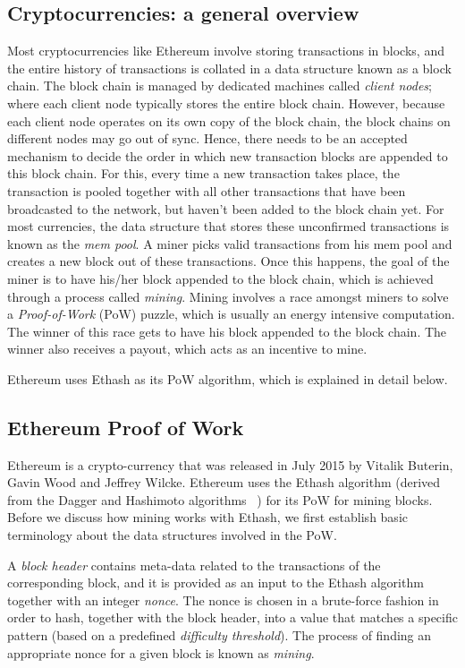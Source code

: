 \documentclass[runningheads]{llncs}
\begin{document}
\subsection{Cryptocurrencies: a general overview}
Most cryptocurrencies like Ethereum involve storing transactions in blocks, and the entire history of transactions is collated in a data structure known as a block chain. The block chain is managed by dedicated machines called \emph{client nodes}; where each client node typically stores the entire block chain. However, because each client node operates on its own copy of the block chain, the block chains on different nodes may go out of sync. Hence, there needs to be an accepted mechanism to decide the order in which new transaction blocks are appended to this block chain. 
For this, every time a new transaction takes place, the transaction is pooled together with all other transactions that have been broadcasted to the network, but haven't been added to the block chain yet. For most currencies, the data structure that stores these unconfirmed transactions is known as the \emph{mem pool}. A miner picks valid transactions from his mem pool and creates a new block out of these transactions. Once this happens, the goal of the miner is to have his/her block appended to the block chain, which is achieved through a process called \emph{mining}.
Mining involves a race amongst miners to solve a \emph{Proof-of-Work} (PoW) puzzle, which is usually an energy intensive computation. The winner of this race gets to have his block appended to the block chain. The winner also receives a payout, which acts as an incentive to mine. 

Ethereum uses Ethash as its PoW algorithm, which is explained in detail below.

\subsection{Ethereum Proof of Work}
Ethereum is a crypto-currency that was released in July 2015 by Vitalik Buterin, Gavin Wood and Jeffrey Wilcke. Ethereum uses the Ethash algorithm (derived from the Dagger and Hashimoto algorithms ~\cite{dagger-hashimoto}) for its PoW for mining blocks. Before we discuss how mining works with Ethash, we first establish basic terminology about the data structures involved in the PoW.

A \emph{block header} contains meta-data related to the transactions of the corresponding block, and it is provided as an input to the Ethash algorithm together with an integer \emph{nonce}.  The nonce is chosen in a brute-force fashion in order to hash, together with the block header, into a value that matches a specific pattern (based on a predefined \emph{difficulty threshold}). The process of finding an appropriate nonce for a given block is known as \emph{mining}.
\end{document}
